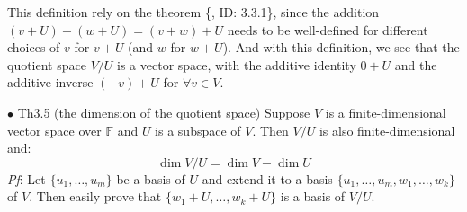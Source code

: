 \documentclass{article}
\begin{document}
\begin{Rmk}{}
    This definition rely on the theorem \{, ID: 3.3.1\}, since the addition $(v+U) + (w+U) = (v+w) + U$ needs to be well-defined for different choices of $v$ for $v+U$ (and $w$ for $w+U$). And with this definition, we see that \textcolor{Th}{the quotient space $V/U$ is a vector space, with the additive identity $0+U$ and the additive inverse $(-v)+U$ for $\forall v\in V$}.
\end{Rmk}

\begin{Th}{$\bullet$ Th3.5 (the dimension of the quotient space)}
    Suppose $V$ is a finite-dimensional vector space over $\mathbb{F}$ and $U$ is a subspace of $V$. Then $V/U$ is also finite-dimensional and:
    $$\dim V/U = \dim V - \dim U$$
    \tcblower
    \textit{Pf}: Let $\{u_1, \dots, u_m\}$ be a basis of $U$ and extend it to a basis $\{u_1, \dots, u_m, w_1, \dots, w_k\}$ of $V$. Then easily prove that $\{w_1+U, \dots, w_k+U\}$ is a basis of $V/U$.
\end{Th}
\end{document}

